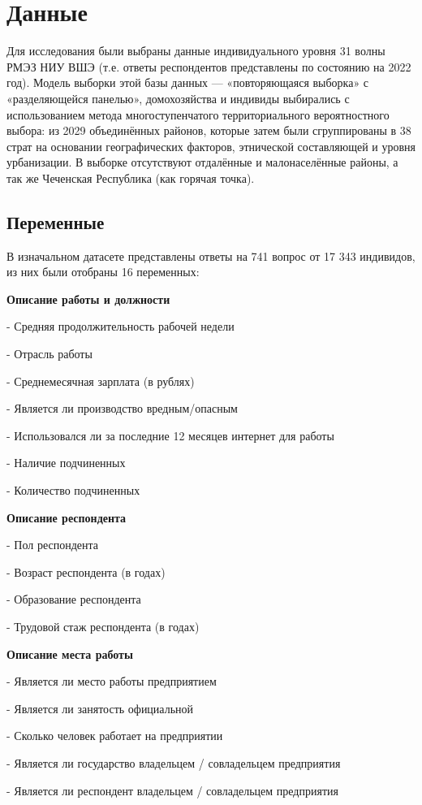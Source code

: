 \documentclass[12pt, a4paper]{article}
\begin{document}
{\section{Данные}
Для исследования были выбраны данные индивидуального уровня 31 волны РМЭЗ НИУ ВШЭ (т.е. ответы респондентов представлены по состоянию на 2022 год). Модель выборки этой базы данных — «повторяющаяся выборка» с «разделяющейся панелью», домохозяйства и индивиды выбирались с использованием метода многоступенчатого территориального вероятностного выбора: из 2029 объединённых районов, которые затем были сгруппированы в 38 страт на основании географических факторов, этнической составляющей и уровня урбанизации. В выборке отсутствуют отдалённые и малонаселённые районы, а так же Чеченская Республика (как горячая точка).

\subsection{Переменные}
В изначальном датасете представлены ответы на 741 вопрос от 17 343 индивидов, из них были отобраны 16 переменных:

\textbf{Описание работы и должности}

-   Средняя продолжительность рабочей недели

-   Отрасль работы 

-   Среднемесячная зарплата (в рублях)

-   Является ли производство вредным/опасным

-   Использовался ли за последние 12 месяцев интернет для работы

-   Наличие подчиненных

-   Количество подчиненных

\textbf{Описание респондента}

-   Пол респондента

-   Возраст респондента (в годах)

-   Образование респондента

-   Трудовой стаж респондента (в годах)

\textbf{Описание места работы}

-   Является ли место работы предприятием

-   Является ли занятость официальной

-   Сколько человек работает на предприятии

-   Является ли государство владельцем / совладельцем предприятия

-   Является ли респондент владельцем / совладельцем предприятия

}
\end{document}
